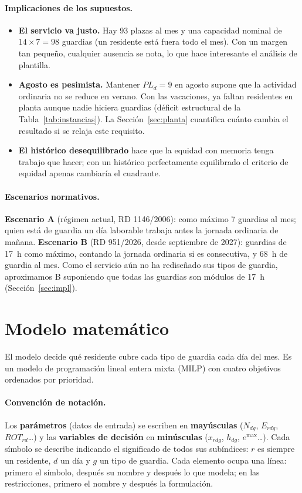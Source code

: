 \paragraph{Implicaciones de los supuestos.}
\begin{itemize}
  \item \textbf{El servicio va justo.} Hay 93 plazas al mes y una capacidad nominal de $14 \times 7 = 98$ guardias (un residente está fuera todo el mes). Con un margen tan pequeño, cualquier ausencia se nota, lo que hace interesante el análisis de plantilla.
  \item \textbf{Agosto es pesimista.} Mantener $PL_d = 9$ en agosto supone que la actividad ordinaria no se reduce en verano. Con las vacaciones, ya faltan residentes en planta aunque nadie hiciera guardias (déficit estructural de la Tabla~\ref{tab:instancias}). La Sección~\ref{sec:planta} cuantifica cuánto cambia el resultado si se relaja este requisito.
  \item \textbf{El histórico desequilibrado} hace que la equidad con memoria tenga trabajo que hacer; con un histórico perfectamente equilibrado el criterio de equidad apenas cambiaría el cuadrante.
\end{itemize}

\paragraph{Escenarios normativos.} \textbf{Escenario A} (régimen actual, RD 1146/2006): como máximo 7 guardias al mes; quien está de guardia un día laborable trabaja antes la jornada ordinaria de mañana. \textbf{Escenario B} (RD 951/2026, desde septiembre de 2027): guardias de 17~h como máximo, contando la jornada ordinaria si es consecutiva, y 68~h de guardia al mes. Como el servicio aún no ha rediseñado sus tipos de guardia, aproximamos B suponiendo que todas las guardias son módulos de 17~h (Sección~\ref{sec:impl}).

\section{Modelo matemático}
\label{sec:modelo}

El modelo decide qué residente cubre cada tipo de guardia cada día del mes. Es un modelo de programación lineal entera mixta (MILP) con cuatro objetivos ordenados por prioridad.

\paragraph{Convención de notación.} Los \textbf{parámetros} (datos de entrada) se escriben en \textbf{mayúsculas} ($N_{dg}$, $E_{rdg}$, $ROT_{rd}$\dots) y las \textbf{variables de decisión} en \textbf{minúsculas} ($x_{rdg}$, $h_{dg}$, $e^{\max}$\dots). Cada símbolo se describe indicando el significado de todos sus subíndices: $r$ es siempre un residente, $d$ un día y $g$ un tipo de guardia. Cada elemento ocupa una línea: primero el símbolo, después su nombre y después lo que modela; en las restricciones, primero el nombre y después la formulación.

